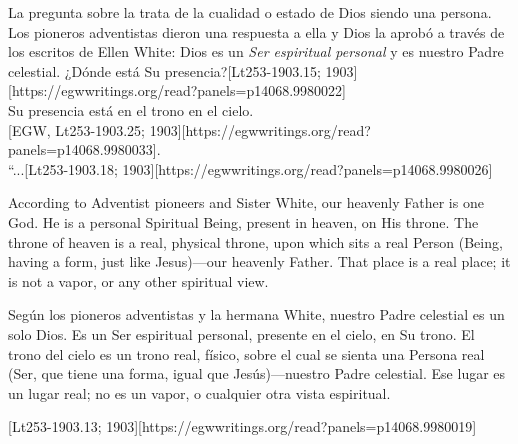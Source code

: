 La pregunta sobre la  trata de la cualidad o estado de Dios siendo una persona. Los pioneros adventistas dieron una respuesta a ella y Dios la aprobó a través de los escritos de Ellen White: Dios es un \textit{Ser espiritual personal} y es nuestro Padre celestial. ¿Dónde está Su presencia?[Lt253-1903.15; 1903][https://egwwritings.org/read?panels=p14068.9980022] \\
Su presencia está en el trono en el cielo. \\
[EGW, Lt253-1903.25; 1903][https://egwwritings.org/read?panels=p14068.9980033]. \\
“...[Lt253-1903.18; 1903][https://egwwritings.org/read?panels=p14068.9980026]


According to Adventist pioneers and Sister White, our heavenly Father is one God. He is a personal Spiritual Being, present in heaven, on His throne. The throne of heaven is a real, physical throne, upon which sits a real Person (Being, having a form, just like Jesus)—our heavenly Father. That place is a real place; it is not a vapor, or any other spiritual view.


Según los pioneros adventistas y la hermana White, nuestro Padre celestial es un solo Dios. Es un Ser espiritual personal, presente en el cielo, en Su trono. El trono del cielo es un trono real, físico, sobre el cual se sienta una Persona real (Ser, que tiene una forma, igual que Jesús)—nuestro Padre celestial. Ese lugar es un lugar real; no es un vapor, o cualquier otra vista espiritual.


[Lt253-1903.13; 1903][https://egwwritings.org/read?panels=p14068.9980019]



